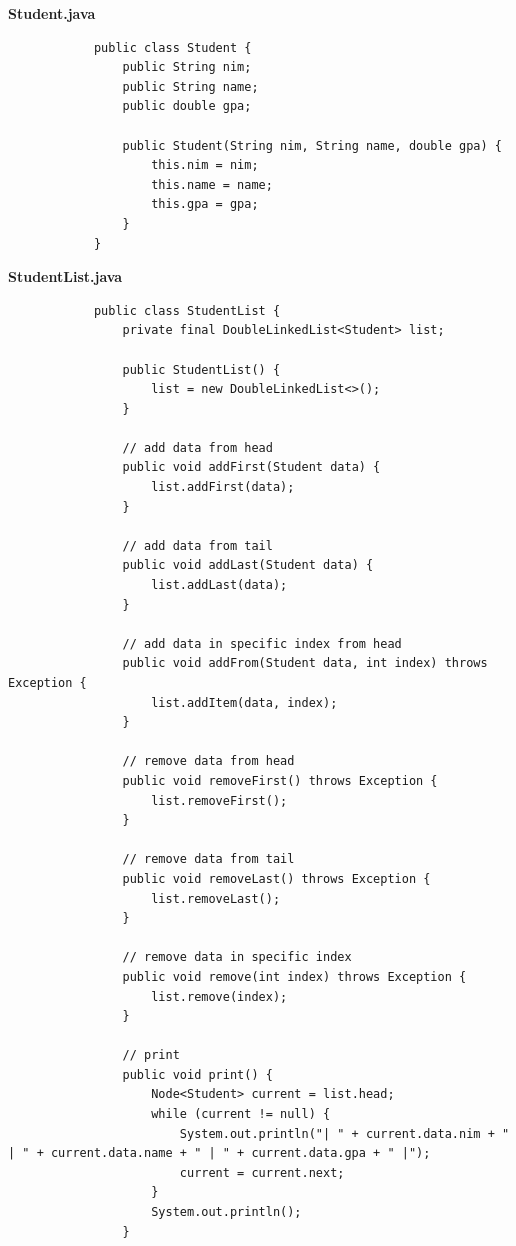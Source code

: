 \documentclass[12pt,titlepage]{article}
\begin{document}
\begin{enumerate}
{        \large{\textbf{Student.java}}
        \begin{verbatim}
            public class Student {
                public String nim;
                public String name;
                public double gpa;

                public Student(String nim, String name, double gpa) {
                    this.nim = nim;
                    this.name = name;
                    this.gpa = gpa;
                }
            }
        \end{verbatim}

        \large{\textbf{StudentList.java}}
        \begin{verbatim}
            public class StudentList {
                private final DoubleLinkedList<Student> list;

                public StudentList() {
                    list = new DoubleLinkedList<>();
                }

                // add data from head
                public void addFirst(Student data) {
                    list.addFirst(data);
                }

                // add data from tail
                public void addLast(Student data) {
                    list.addLast(data);
                }

                // add data in specific index from head
                public void addFrom(Student data, int index) throws Exception {
                    list.addItem(data, index);
                }

                // remove data from head
                public void removeFirst() throws Exception {
                    list.removeFirst();
                }

                // remove data from tail
                public void removeLast() throws Exception {
                    list.removeLast();
                }

                // remove data in specific index
                public void remove(int index) throws Exception {
                    list.remove(index);
                }

                // print
                public void print() {
                    Node<Student> current = list.head;
                    while (current != null) {
                        System.out.println("| " + current.data.nim + " | " + current.data.name + " | " + current.data.gpa + " |");
                        current = current.next;
                    }
                    System.out.println();
                }


\end{verbatim}}
\end{enumerate}
\end{document}
